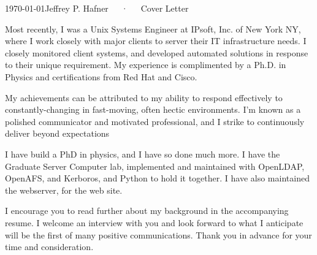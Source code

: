 \documentclass[11pt, letterpaper]{awesome-cv}
\begin{document}
\makecvheader[R]

\makecvfooter
  {\today}{Jeffrey P. Hafner~~~·~~~Cover Letter}{}

\makelettertitle

\begin{cvletter}

    

Most recently, I was a Unix Systems Engineer at IPsoft, Inc. of New  York NY, where I work closely with major clients to server their IT infrastructure needs.
I closely monitored client systems, and developed automated solutions in response to their unique requirement.
My experience is complimented by a Ph.D. in Physics and certifications from Red Hat and Cisco.

My achievements can be attributed to my ability to respond effectively to constantly-changing in fast-moving, often hectic environments.
    I'm known as a polished communicator and motivated professional, and I strike to continuously deliver beyond expectations


I have build a PhD in physics, and I have so done much more.
I have the Graduate Server Computer lab, implemented and maintained with OpenLDAP, OpenAFS, and Kerboros, and Python to hold it together.
I have also maintained the webserver, for the web site.


I encourage you to read further about my background in the accompanying resume.
I welcome an interview with you and look forward to what I anticipate will be the first of many positive communications.
Thank you in advance for your time and consideration.



\end{cvletter}
\end{document}
